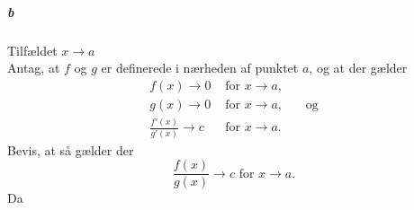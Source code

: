 \documentclass[12pt]{article}
\begin{document}
\subparagraph{b} Tilfældet $x \to a$\\
Antag, at $f$ og $g$ er definerede i nærheden af punktet $a$, og at der gælder
\begin{align}
f(x)\to 0 &\text{ for } x\to a,\\
g(x)\to 0 &\text{ for } x\to a, \phantom{mm}\text{og}\\
\frac{f'(x)}{g'(x)}\to c &\text{ for } x\to a.
\end{align}
Bevis, at så gælder der
\begin{equation}
\frac{f(x)}{g(x)}\to c \text{ for } x\to a.
\end{equation}
Da
\end{document}
